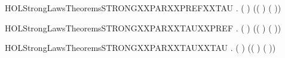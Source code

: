 \begin{SaveVerbatim}{HOLStrongLawsTheoremsSTRONGXXPARXXPREFXXTAU}
\HOLTokenTurnstile{} \HOLSymConst{\HOLTokenForall{}}  .
        ( \HOLSymConst{\ensuremath{\parallel}} \HOLConst{\ensuremath{\tau}})
         (( \HOLSymConst{\ensuremath{\parallel}} \HOLConst{\ensuremath{\tau}}) \HOLSymConst{\ensuremath{+}} \HOLConst{\ensuremath{\tau}}( \HOLSymConst{\ensuremath{\parallel}} ))
\end{SaveVerbatim}
\newcommand{\HOLStrongLawsTheoremsSTRONGXXPARXXPREFXXTAU}{\UseVerbatim{HOLStrongLawsTheoremsSTRONGXXPARXXPREFXXTAU}}
\begin{SaveVerbatim}{HOLStrongLawsTheoremsSTRONGXXPARXXTAUXXPREF}
\HOLTokenTurnstile{} \HOLSymConst{\HOLTokenForall{}}  .
        (\HOLConst{\ensuremath{\tau}} \HOLSymConst{\ensuremath{\parallel}} )
         (\HOLConst{\ensuremath{\tau}}( \HOLSymConst{\ensuremath{\parallel}} ) \HOLSymConst{\ensuremath{+}} (\HOLConst{\ensuremath{\tau}} \HOLSymConst{\ensuremath{\parallel}} ))
\end{SaveVerbatim}
\newcommand{\HOLStrongLawsTheoremsSTRONGXXPARXXTAUXXPREF}{\UseVerbatim{HOLStrongLawsTheoremsSTRONGXXPARXXTAUXXPREF}}
\begin{SaveVerbatim}{HOLStrongLawsTheoremsSTRONGXXPARXXTAUXXTAU}
\HOLTokenTurnstile{} \HOLSymConst{\HOLTokenForall{}} .
        (\HOLConst{\ensuremath{\tau}} \HOLSymConst{\ensuremath{\parallel}} \HOLConst{\ensuremath{\tau}})
         (\HOLConst{\ensuremath{\tau}}( \HOLSymConst{\ensuremath{\parallel}} \HOLConst{\ensuremath{\tau}}) \HOLSymConst{\ensuremath{+}} \HOLConst{\ensuremath{\tau}}(\HOLConst{\ensuremath{\tau}} \HOLSymConst{\ensuremath{\parallel}} ))
\end{SaveVerbatim}
